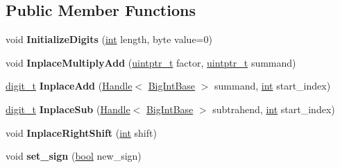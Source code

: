 \subsection*{Public Member Functions}
\begin{DoxyCompactItemize}
\item 
\mbox{\label{classv8_1_1internal_1_1MutableBigInt_ae1173ed238bb903f1d3ccbcb87777bf3}} 
void {\bfseries Initialize\+Digits} (\mbox{\hyperlink{classint}{int}} length, byte value=0)
\item 
\mbox{\label{classv8_1_1internal_1_1MutableBigInt_ad83b1e156f784e6c7d69a81516e0f1f6}} 
void {\bfseries Inplace\+Multiply\+Add} (\mbox{\hyperlink{classuintptr__t}{uintptr\+\_\+t}} factor, \mbox{\hyperlink{classuintptr__t}{uintptr\+\_\+t}} summand)
\item 
\mbox{\label{classv8_1_1internal_1_1MutableBigInt_a79e664635a5a0fe013f032cd23da6f74}} 
\mbox{\hyperlink{classuintptr__t}{digit\+\_\+t}} {\bfseries Inplace\+Add} (\mbox{\hyperlink{classv8_1_1internal_1_1Handle}{Handle}}$<$ \mbox{\hyperlink{classv8_1_1internal_1_1BigIntBase}{Big\+Int\+Base}} $>$ summand, \mbox{\hyperlink{classint}{int}} start\+\_\+index)
\item 
\mbox{\label{classv8_1_1internal_1_1MutableBigInt_a4ef25a28372fa7681e09e32a95b6c88b}} 
\mbox{\hyperlink{classuintptr__t}{digit\+\_\+t}} {\bfseries Inplace\+Sub} (\mbox{\hyperlink{classv8_1_1internal_1_1Handle}{Handle}}$<$ \mbox{\hyperlink{classv8_1_1internal_1_1BigIntBase}{Big\+Int\+Base}} $>$ subtrahend, \mbox{\hyperlink{classint}{int}} start\+\_\+index)
\item 
\mbox{\label{classv8_1_1internal_1_1MutableBigInt_a1903ff1bd79aee78e12b49a4c2a5d380}} 
void {\bfseries Inplace\+Right\+Shift} (\mbox{\hyperlink{classint}{int}} shift)
\item 
\mbox{\label{classv8_1_1internal_1_1MutableBigInt_a482267113ce0ce9acf82274a1d46e193}} 
void {\bfseries set\+\_\+sign} (\mbox{\hyperlink{classbool}{bool}} new\+\_\+sign)
\item 
\mbox{\label{classv8_1_1internal_1_1MutableBigInt_a5be2281a78aafc53ed879f3c0e73bf4c}} 

\end{DoxyCompactItemize}

